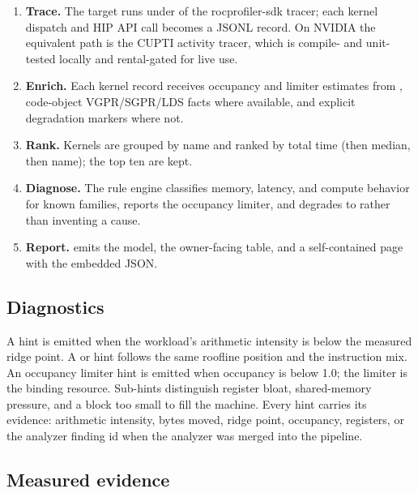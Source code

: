 \begin{enumerate}
  \item \textbf{Trace.} The target runs under  of the
        rocprofiler-sdk tracer; each kernel dispatch and HIP API call becomes a
        JSONL record. On NVIDIA the equivalent path is the CUPTI activity
        tracer, which is compile- and unit-tested locally and rental-gated for
        live use.
  \item \textbf{Enrich.} Each kernel record receives occupancy and limiter
        estimates from , code-object VGPR/SGPR/LDS
        facts where available, and explicit degradation markers where not.
  \item \textbf{Rank.} Kernels are grouped by name and ranked by total time
        (then median, then name); the top ten are kept.
  \item \textbf{Diagnose.} The rule engine classifies memory, latency, and
        compute behavior for known families, reports the occupancy limiter,
        and degrades to  rather than inventing a
        cause.
  \item \textbf{Report.}  emits the model,  the
        owner-facing table, and  a self-contained page with the
        embedded JSON.
\end{enumerate}

\subsection{Diagnostics}
\label{sec:c6-diagnostics}

A  hint is emitted when the workload's arithmetic intensity
is below the measured ridge point. A  or
 hint follows the same roofline position and the
instruction mix. An occupancy limiter hint is emitted when occupancy is below
1.0; the limiter is the binding resource. Sub-hints distinguish register
bloat, shared-memory pressure, and a block too small to fill the machine.
Every hint carries its evidence: arithmetic intensity, bytes moved, ridge
point, occupancy, registers, or the analyzer finding id when the analyzer was
merged into the pipeline.

\subsection{Measured evidence}
\label{sec:c6-evidence}


